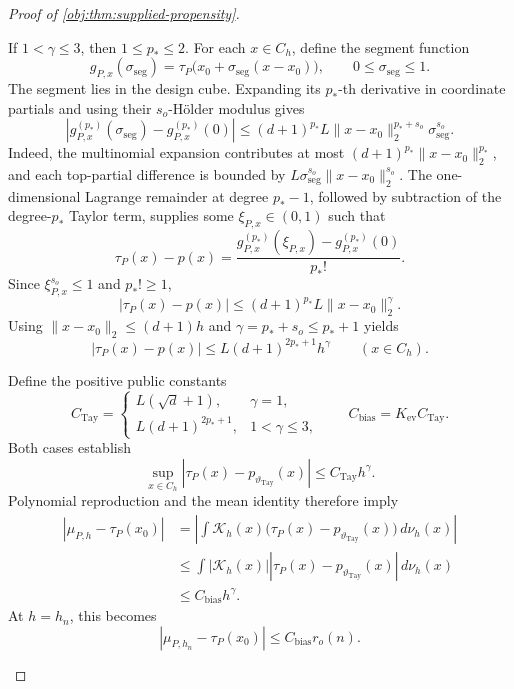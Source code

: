\documentclass[11pt]{article}
\begin{document}
\begin{proof}[Proof of \cref{obj:thm:supplied-propensity}]
\begin{enumerate}
If \(1<\gamma\le3\), then \(1\le p_*\le2\). For each \(x\in C_h\), define the segment function
\[
g_{P,x}(\sigma_{\mathrm{seg}})=\tau_P\bigl(x_0+\sigma_{\mathrm{seg}}(x-x_0)\bigr),
\qquad 0\le\sigma_{\mathrm{seg}}\le1.
\]
The segment lies in the design cube. Expanding its \(p_*\)-th derivative in coordinate partials and using their \(s_o\)-Hölder modulus gives
\[
\left|g_{P,x}^{(p_*)}(\sigma_{\mathrm{seg}})-g_{P,x}^{(p_*)}(0)\right|
\le
(d+1)^{p_*}L
\|x-x_0\|_2^{p_*+s_o}\sigma_{\mathrm{seg}}^{s_o}.
\]
Indeed, the multinomial expansion contributes at most
\((d+1)^{p_*}\|x-x_0\|_2^{p_*}\), and each top-partial difference is bounded by
\(L\sigma_{\mathrm{seg}}^{s_o}\|x-x_0\|_2^{s_o}\).
The one-dimensional Lagrange remainder at degree \(p_*-1\), followed by subtraction of the degree-\(p_*\) Taylor term, supplies some
\(\xi_{P,x}\in(0,1)\) such that
\[
\tau_P(x)-p(x)
=
\frac{
g_{P,x}^{(p_*)}(\xi_{P,x})
-g_{P,x}^{(p_*)}(0)
}{p_*!}.
\]
Since \(\xi_{P,x}^{s_o}\le1\) and \(p_*!\ge1\),
\[
|\tau_P(x)-p(x)|
\le(d+1)^{p_*}L\|x-x_0\|_2^\gamma.
\]
Using \(\|x-x_0\|_2\le(d+1)h\) and
\(\gamma=p_*+s_o\le p_*+1\) yields
\[
|\tau_P(x)-p(x)|
\le L(d+1)^{2p_*+1}h^\gamma
\qquad(x\in C_h).
\]

Define the positive public constants
\[
C_{\mathrm{Tay}}=
\begin{cases}
L(\sqrt d+1),&\gamma=1,\\
L(d+1)^{2p_*+1},&1<\gamma\le3,
\end{cases}
\qquad
C_{\mathrm{bias}}=K_{\mathrm{ev}}C_{\mathrm{Tay}}.
\]
Both cases establish
\[
\sup_{x\in C_h}|\tau_P(x)-p_{\vartheta_{\mathrm{Tay}}}(x)|
\le C_{\mathrm{Tay}}h^\gamma.
\]
Polynomial reproduction and the mean identity therefore imply
\[
\begin{aligned}
|\mu_{P,h}-\tau_P(x_0)|
&=
\left|
\int\mathcal K_h(x)
\bigl(\tau_P(x)-p_{\vartheta_{\mathrm{Tay}}}(x)\bigr)
\,d\nu_h(x)
\right|\\
&\le
\int|\mathcal K_h(x)|
\left|\tau_P(x)-p_{\vartheta_{\mathrm{Tay}}}(x)\right|
\,d\nu_h(x)\\
&\le C_{\mathrm{bias}}h^\gamma.
\end{aligned}
\]
At \(h=h_n\), this becomes
\[
|\mu_{P,h_n}-\tau_P(x_0)|
\le C_{\mathrm{bias}}r_o(n).
\]


\end{enumerate}
\end{proof}
\end{document}
